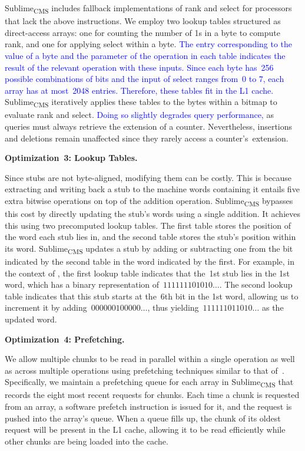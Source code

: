 \documentclass[sigconf]{acmart}
\newcommand{\sketch}{Sublime}
\newcommand{\sketchcms}{\sketch\textsubscript{CMS}\xspace}
\begin{document}
\sketchcms includes fallback implementations of rank and select for processors
that lack the above instructions. We employ two lookup tables structured as
direct-access arrays: one for counting the number of 1s in a byte to compute
rank, and one for applying select within a byte. \textcolor{blue}{The entry
corresponding to the value of a byte and the parameter of the operation in each
table indicates the result of the relevant operation with these inputs. Since
each byte has~256 possible combinations of bits and the input of select ranges
from~0 to 7, each array has at most~2048 entries. Therefore, these tables fit
in the L1 cache.} \sketchcms iteratively applies these tables to the bytes
within a bitmap to evaluate rank and select. \textcolor{blue}{Doing so slightly
degrades query performance,} as queries must always retrieve the extension of a
counter. Nevertheless, insertions and deletions remain unaffected since they
rarely access a counter's~extension.

\hypertarget{optimization:lookup_tables}{\textbf{Optimization~3: Lookup Tables.}}
Since stubs are not byte-aligned, modifying them can be costly. This is because
extracting and writing back a stub to the machine words containing it entails
five extra bitwise operations on top of the addition operation. \sketchcms
bypasses this cost by directly updating the stub's words using a single
addition. It achieves this using two precomputed lookup tables. The first table
stores the position of the word each stub lies in, and the second table stores
the stub's position within its word. \sketchcms updates a stub by adding or
subtracting one from the bit indicated by the second table in the word
indicated by the first. For example, in the context of
, the first lookup table indicates that the~1st stub
lies in the 1st word, which has a binary representation of~$111111101010\dots$.
The second lookup table indicates that this stub starts at the~6th bit in the
1st word, allowing us to increment it by adding~$000000100000\dots$, thus
yielding~$111111011010\dots$ as the updated word.

\hypertarget{optimization:prefetching}{\textbf{Optimization~4: Prefetching.}}
We allow multiple chunks to be read in parallel within a single operation as
well as across multiple operations using prefetching techniques similar to that
of~\cite{StingySketch}. Specifically, we maintain a prefetching queue for each
array in \sketchcms that records the eight most recent requests for chunks.
Each time a chunk is requested from an array, a software prefetch instruction
is issued for it, and the request is pushed into the array's queue. When a
queue fills up, the chunk of its oldest request will be present in the L1
cache, allowing it to be read efficiently while other chunks are being loaded
into the cache. 
\end{document}
